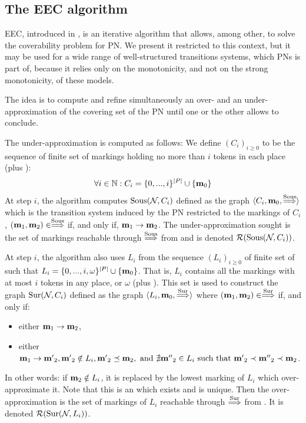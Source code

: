 \subsection{The \ac{EEC} algorithm}
\label{sec:eec}

\ac{EEC}, introduced in \cite{Geeraerts07thesis, Geeraerts06}, is an iterative algorithm that allows, among other, to solve the coverability problem for \ac{PN}.
We present it restricted to this context, but it may be used for a wide range of well-structured transitions systems, which \acp{PN} is part of, because it relies only on the monotonicity, and not on the strong monotonicity, of these models.

The idea is to compute and refine simultaneously an over- and an under-approximation of the covering set of the \ac{PN} until one or the other allows to conclude.

The under-approximation is computed as follows:
We define $(C_i)_{i \geq 0}$ to be the sequence of finite set of markings holding no more than $i$ tokens in each place (plus \mari):
\[
  \forall i \in \mathbb{N} : C_i = \{0, ..., i\}^{\left|P\right|} \cup \{\mathbf{m}_0\}
\]
At step $i$, the algorithm computes $\operatorname{Sous}(\mathcal{N}_{}, C_i)$ defined as the graph $\langle C_i, \mathbf{m}_0, \stackrel{\operatorname{Sous}}{\Longrightarrow} \rangle$ which is the transition system induced by the \ac{PN} \namePN restricted to the markings of $C_i$,  $(\mathbf{m}_1, \mathbf{m}_2) \in \stackrel{\operatorname{Sous}}{\Longrightarrow}$ if, and only if, $\mathbf{m}_1 \rightarrow \mathbf{m}_2$.
The under-approximation sought is the set of markings reachable through $\stackrel{\operatorname{Sous}}{\Longrightarrow}$ from \mari and is denoted $\operatorname{\mathcal{R}}(\operatorname{Sous}(\mathcal{N}_{}, C_i))$.

At step $i$, the algorithm also uses $L_i$ from the sequence $(L_i)_{i \geq 0}$ of finite set of \omarks such that $L_i = \{0, ..., i, \omega \}^{\left|P\right|} \cup \{\mathbf{m}_0\}$.
That is, $L_i$ contains all the markings with at most $i$ tokens in any place, or $\omega$ (plus \mari).
This set is used to construct the graph $\operatorname{Sur}(\mathcal{N}_{}, C_i)$ defined as the graph $\langle L_i, \mathbf{m}_0, \stackrel{\operatorname{Sur}}{\Longrightarrow} \rangle$ where $(\mathbf{m}_1, \mathbf{m}_2) \in \stackrel{\operatorname{Sur}}{\Longrightarrow}$ if, and only if:
\begin{itemize}
  \item either $\mathbf{m}_1 \rightarrow \mathbf{m}_2$,
  \item either $\mathbf{m}_1 \rightarrow \mathbf{m'}_2, \mathbf{m'}_2 \notin L_i, \mathbf{m'}_2 \preceq \mathbf{m}_2, \text{ and } \nexists \mathbf{m''}_2 \in L_i \text{ such that } \mathbf{m'}_2 \prec \mathbf{m''}_2 \prec \mathbf{m}_2$.
\end{itemize}
In other words: if $\mathbf{m}_2 \notin L_i$, it is replaced by the lowest marking of $L_i$ which over-approximate it.
Note that this is an \omark which exists and is unique. 
Then the over-approximation is the set of markings of $L_i$ reachable through $\stackrel{\operatorname{Sur}}{\Longrightarrow}$ from \mari. It is denoted $\operatorname{\mathcal{R}}(\operatorname{Sur}(\mathcal{N}_{}, L_i))$.

